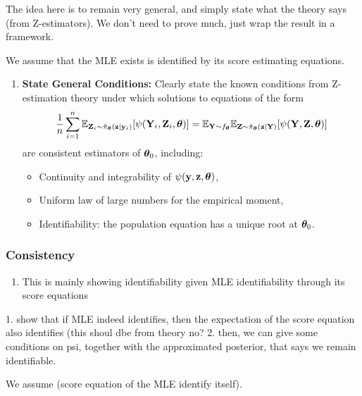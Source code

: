 \documentclass[twoside,11pt]{article}
\begin{document}
\begin{tcolorbox}[colback=yellow!5!white,colframe=yellow!60!black,title=First Objective: Write the General Case Conditions]
The idea here is to remain very general, and simply state what the theory says (from Z-estimators). We don't need to prove much, just wrap the result in a framework.

We assume that the MLE exists is identified by its score estimating equations.

\begin{enumerate}
    \item \textbf{State General Conditions:} Clearly state the known conditions from Z-estimation theory under which solutions to equations of the form
    \[
    \frac{1}{n} \sum_{i=1}^n \mathbb{E}_{{\bf Z}_i \sim \tilde\pi_{\bm{\theta}}({\bf z} \mid {\bf y}_i)}[\psi({\bf Y}_i, {\bf Z}_i, {\bm{\theta}})] 
    = 
    \mathbb{E}_{{\bf Y} \sim f_{\bm{\theta}}} \mathbb{E}_{{\bf Z} \sim \tilde\pi_{\bm{\theta}}({\bf z} \mid {\bf Y})}[\psi({\bf Y}, {\bf Z}, {\bm{\theta}})]
    \]
    are consistent estimators of \( {\bm{\theta}}_0 \), including:
    \begin{itemize}
        \item Continuity and integrability of \( \psi({\bf y}, {\bf z}, {\bm{\theta}}) \),
        \item Uniform law of large numbers for the empirical moment,
        \item Identifiability: the population equation has a unique root at \( {\bm{\theta}}_0 \).
    \end{itemize}
\end{enumerate}
\end{tcolorbox}

\subsubsection{Consistency}
\begin{enumerate}
    \item This is mainly showing identifiability given MLE identifiability through its score equations
\end{enumerate}

1. show that if MLE indeed identifies, then the expectation of the score equation also identifies (this shoul dbe from theory no?
2. then, we can give some conditions on psi, together with the approximated posterior, that says we remain identifiable.

We assume (score equation of the MLE identify itself).
\end{document}
